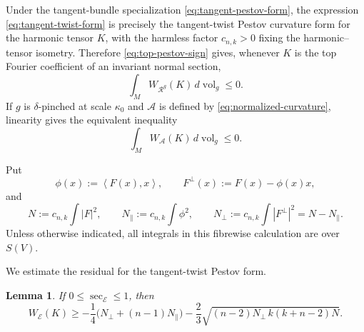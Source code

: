 \documentclass[reqno,11pt]{amsart}
\newtheorem{lemma}[theorem]{Lemma}
\theoremstyle{definition}
\newcommand{\Rop}{\mathscr R}
\newcommand{\cA}{\mathcal A}
\newcommand{\cE}{\mathcal E}
\newcommand{\vol}{\operatorname{vol}}
\newcommand{\inner}[2]{\left\langle #1,#2\right\rangle}
\begin{document}
Under the tangent-bundle specialization
\eqref{eq:tangent-pestov-form}, the expression
\eqref{eq:tangent-twist-form} is precisely the tangent-twist Pestov curvature form
for the harmonic tensor $K$, with the harmless factor $c_{n,k}>0$ fixing the
harmonic--tensor isometry.  Therefore \eqref{eq:top-pestov-sign} gives, whenever
$K$ is the top Fourier coefficient of an invariant normal section,
\begin{equation*}
  \int_M W_{\Rop^g}(K)\,d\vol_g\leq0.
\end{equation*}
If $g$ is $\delta$-pinched at scale $\kappa_0$ and $\cA$ is defined by
\eqref{eq:normalized-curvature}, linearity gives the equivalent inequality
\begin{equation}\label{eq:tangent-twist-pestov-normalized}
  \int_M W_{\cA}(K)\,d\vol_g\leq0.
\end{equation}

Put
$$
  \phi(x):=\inner{F(x)}x,
  \qquad
  F^\perp(x):=F(x)-\phi(x)x,
$$
and
\begin{equation*}
  N:=c_{n,k}\int|F|^2,
  \qquad
  N_{\parallel}:=c_{n,k}\int \phi^2,
  \qquad
  N_{\perp}:=c_{n,k}\int|F^\perp|^2=N-N_{\parallel}.
\end{equation*}
Unless otherwise indicated, all integrals in this fibrewise calculation are
over $S(V)$.

We estimate the residual for the tangent-twist Pestov form.
\begin{lemma}\label{lem:tangent-twist-residual}
If $0\leq\sec_{\cE}\leq1$, then
\begin{equation*}
  W_{\cE}(K)
  \geq-\frac14\bigl(N_{\perp}+(n-1)N_{\parallel}\bigr)
  -\frac23\sqrt{(n-2)N_{\perp}\,k(k+n-2)N}.
\end{equation*}
\end{lemma}
\end{document}

